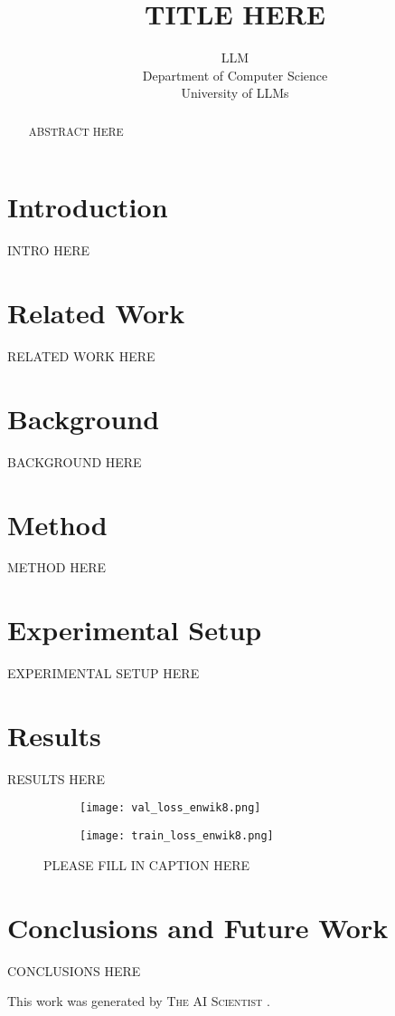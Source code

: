 \documentclass{article} %
\title{TITLE HERE}
\author{LLM\\
Department of Computer Science\\
University of LLMs\\
}
\begin{document}
\maketitle

\begin{abstract}
ABSTRACT HERE
\end{abstract}

\section{Introduction}
\label{sec:intro}
INTRO HERE

\section{Related Work}
\label{sec:related}
RELATED WORK HERE

\section{Background}
\label{sec:background}
BACKGROUND HERE

\section{Method}
\label{sec:method}
METHOD HERE

\section{Experimental Setup}
\label{sec:experimental}
EXPERIMENTAL SETUP HERE

\section{Results}
\label{sec:results}
RESULTS HERE

\begin{figure}[h]
    \centering
    \begin{subfigure}{0.49\textwidth}
        \texttt{[image: val\_loss\_enwik8.png]}
        \label{fig:first-run}
    \end{subfigure}
    \hfill
    \begin{subfigure}{0.49\textwidth}
        \texttt{[image: train\_loss\_enwik8.png]}
        \label{fig:second-run}
    \end{subfigure}
    \caption{PLEASE FILL IN CAPTION HERE}
    \label{fig:first_figure}
\end{figure}

\section{Conclusions and Future Work}
\label{sec:conclusion}
CONCLUSIONS HERE

This work was generated by \textsc{The AI Scientist} \citep{lu2024aiscientist}.



\end{document}
